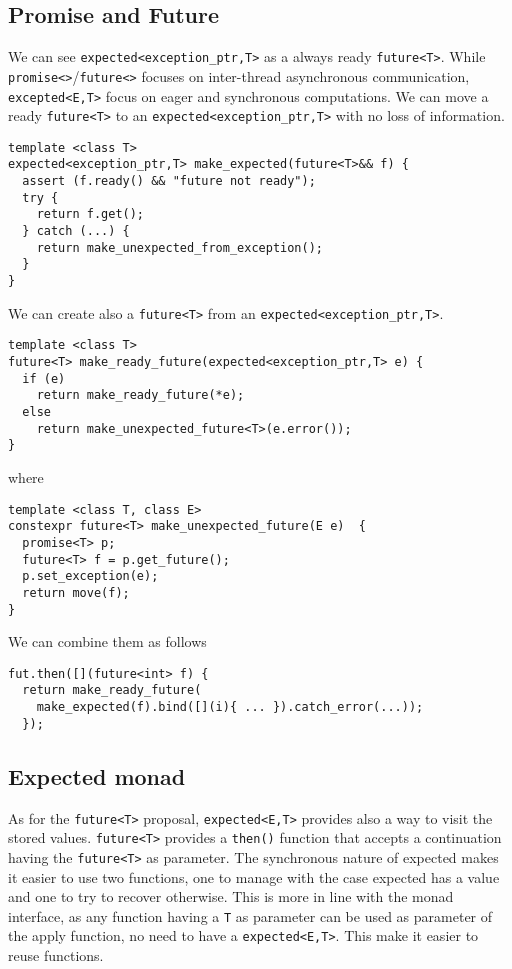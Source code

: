 \documentclass[a4paper,10pt]{article}
\newcommand{\cpp}[1]{\lstinline{#1}}
\begin{document}
\subsection{Promise and Future}

We can see \cpp{expected<exception_ptr,T>} as a always ready \cpp{future<T>}.
While \cpp{promise<>}/\cpp{future<>} focuses on inter-thread asynchronous communication, \cpp{excepted<E,T>} focus on eager and synchronous computations.
We can move a ready \cpp{future<T>} to an \cpp{expected<exception_ptr,T>} with no loss of information. 

\begin{lstlisting}
template <class T>
expected<exception_ptr,T> make_expected(future<T>&& f) {
  assert (f.ready() && "future not ready");
  try {
    return f.get();
  } catch (...) {
    return make_unexpected_from_exception();
  }
}
\end{lstlisting}

We can create also a \cpp{future<T>} from an \cpp{expected<exception_ptr,T>}.

\begin{lstlisting}
template <class T>
future<T> make_ready_future(expected<exception_ptr,T> e) {
  if (e) 
    return make_ready_future(*e);
  else 
    return make_unexpected_future<T>(e.error()); 
}
\end{lstlisting}

where

\begin{lstlisting}
template <class T, class E>
constexpr future<T> make_unexpected_future(E e)  {
  promise<T> p;
  future<T> f = p.get_future();
  p.set_exception(e);
  return move(f);
}
\end{lstlisting}

We can combine them as follows

\begin{lstlisting}
fut.then([](future<int> f) { 
  return make_ready_future(
    make_expected(f).bind([](i){ ... }).catch_error(...));
  });
\end{lstlisting}

\subsection{Expected monad}

As for the \cpp{future<T>} proposal, \cpp{expected<E,T>} provides also a way to visit the stored values.
\cpp{future<T>} provides a \cpp{then()} function that accepts a continuation having the \cpp{future<T>} as parameter. The synchronous nature of expected makes it easier to use two functions, one to manage with the case expected has a value and one to try to recover otherwise. This is more in line with the monad interface, as any function having a \cpp{T} as parameter can be used as parameter of the apply function, no need to have a \cpp{expected<E,T>}. This make it easier to reuse functions. 
\end{document}
